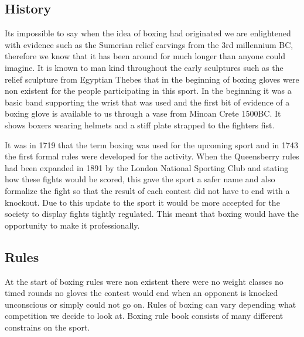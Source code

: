 \documentclass[a4paper,12pt,twoside]{report}
\begin{document}
\subsection{History}
Its impossible to say when the idea of boxing had originated we are enlightened with evidence such as the Sumerian relief carvings from the 3rd millennium BC, therefore we know that it has been around for much longer than anyone could imagine.\newline
It is known to man kind throughout the early sculptures such as the relief sculpture from Egyptian Thebes that in the beginning of boxing gloves were non existent for the people participating in this sport.\newline
In the beginning it was a basic band supporting the wrist that was used and the first bit of evidence of a boxing glove is available to us through a vase from Minoan Crete 1500BC. It shows boxers wearing helmets and a stiff plate strapped to the fighters fist.
\cite{Boxing}

It was in 1719 that the term boxing was used for the upcoming sport and in 1743 the first formal rules were developed for the activity. When the Queensberry rules had been expanded in 1891 by the London National Sporting Club and stating how these fights would be scored, this gave the sport a safer name and also formalize the fight so that the result of each contest did not have to end with a knockout.
\cite{modernBoxing}
Due to this update to the sport it would be more accepted for the society to display fights tightly regulated. This meant that boxing would have the opportunity to make it professionally. 
\subsection{Rules}
At the start of boxing rules were non existent there were no weight classes no timed rounds no gloves the contest would end when an opponent is knocked unconscious or simply could not go on. 
Rules of boxing can vary depending what competition we decide to look at. Boxing rule book consists of many different constrains on the sport.\linebreak
\end{document}
